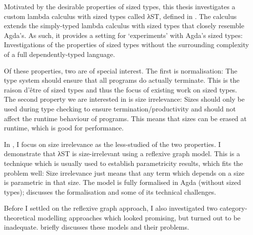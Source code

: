 Motivated by the desirable properties of sized types, this thesis investigates a
custom lambda calculus with sized types called λST, defined in .
The calculus extends the simply-typed lambda calculus with sized types that
closely resemble Agda's. As such, it provides a setting for
\enquote*{experiments} with Agda's sized types: Investigations of the properties
of sized types without the surrounding complexity of a full dependently-typed
language.

Of these properties, two are of special interest. The first is normalisation:
The type system should ensure that all programs do actually terminate. This is
the raison d'être of sized types and thus the focus of existing work on sized
types. The second property we are interested in is size irrelevance: Sizes
should only be used during type checking to ensure termination/productivity and
should not affect the runtime behaviour of programs. This means that sizes can
be erased at runtime, which is good for performance.

In , I focus on size irrelevance as the less-studied of the two
properties. I demonstrate that λST is size-irrelevant using a reflexive graph
model. This is a technique which is usually used to establish parametricity
results, which fits the problem well: Size irrelevance just means that any term
which depends on a size is parametric in that size. The model is fully
formalised in Agda (without sized types);  discusses the
formalisation and some of its technical challenges.

Before I settled on the reflexive graph approach, I also investigated two
category-theoretical modelling approaches which looked promising, but turned out
to be inadequate.  briefly discusses these models and their
problems.
